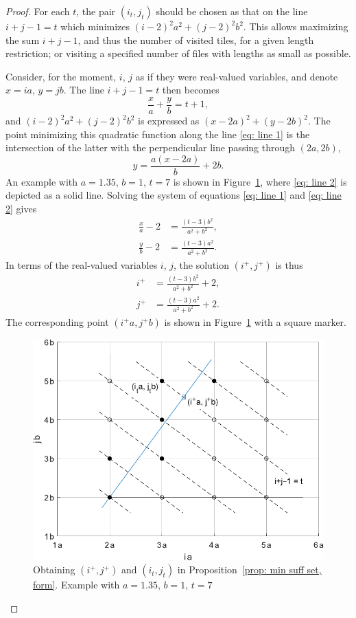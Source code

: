 \documentclass[12pt, a4paper]{article}
\newcommand{\tiles}{t} %
\newcommand{\isolr}{i^+}
\newcommand{\jsolr}{j^+}
\begin{document}
\begin{proof}
For each $\tiles$, the pair $(i_\tiles,j_\tiles)$ should be chosen as that on the line $i+j-1=\tiles$ which minimizes $(i-2)^2 a^2 + (j-2)^2 b^2$. This allows maximizing the sum $i+j-1$, and thus the number of visited tiles, for a given length restriction; or visiting a specified number of files with lengths as small as possible.

Consider, for the moment, $i$, $j$ as if they were real-valued variables, and denote $x=ia$, $y=jb$. The line $i+j-1 = \tiles$ then becomes
\begin{equation}
\label{eq: line 1}
\frac x a + \frac y b = \tiles + 1,
\end{equation}
and $(i-2)^2 a^2 + (j-2)^2 b^2$ is expressed as $(x-2a)^2+(y-2b)^2$. The point minimizing this quadratic function along the line \eqref{eq: line 1} is the intersection of the latter with the perpendicular line passing through $(2a,2b)$,
\begin{equation}
\label{eq: line 2}
y = \frac {a (x-2a)} b + 2b.
\end{equation}
An example with $a=1.35$, $b=1$, $\tiles=7$ is shown in Figure~\ref{fig: min suff set, form}, where \eqref{eq: line 2} is depicted as a solid line. Solving the system of equations \eqref{eq: line 1} and \eqref{eq: line 2} gives 
\begin{align}
\frac x a - 2 &= \frac{(\tiles-3)b^2}{a^2+b^2}, \\
\frac y b - 2 &= \frac{(\tiles-3)a^2}{a^2+b^2}.
\end{align}
In terms of the real-valued variables $i$, $j$, the solution $(\isolr, \jsolr)$ is thus
\begin{align}
\label{eq: prop: min suff set, form: isolr}
\isolr &= \frac{(\tiles-3)b^2}{a^2+b^2} + 2, \\
\label{eq: prop: min suff set, form: jsolr}
\jsolr &= \frac{(\tiles-3)a^2}{a^2+b^2} + 2.
\end{align}
The corresponding point $(\isolr a, \jsolr b)$ is shown in Figure~\ref{fig: min suff set, form} with a square marker.

\begin{figure}%
\centering%
\includegraphics[width=.7\textwidth]{mss}%
\caption{Obtaining $(\isolr, \jsolr)$ and $(i_\tiles, j_\tiles)$ in  Proposition~\ref{prop: min suff set, form}. Example with $a=1.35$, $b=1$, $\tiles=7$%
}%
\label{fig: min suff set, form}%
\end{figure}%


\end{proof}
\end{document}
